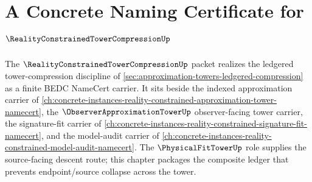 \chapter{A Concrete Naming Certificate for $\RealityConstrainedTowerCompressionUp$}
\label{ch:concrete-instances-reality-constrained-tower-compression-namecert}

The $\RealityConstrainedTowerCompressionUp$ packet realizes the ledgered tower-compression discipline of \autoref{sec:approximation-towers-ledgered-compression} as a finite BEDC NameCert carrier. It sits beside the indexed approximation carrier of \autoref{ch:concrete-instances-reality-constrained-approximation-tower-namecert}, the $\ObserverApproximationTowerUp$ observer-facing tower carrier, the signature-fit carrier of \autoref{ch:concrete-instances-reality-constrained-signature-fit-namecert}, and the model-audit carrier of \autoref{ch:concrete-instances-reality-constrained-model-audit-namecert}. The $\PhysicalFitTowerUp$ role supplies the source-facing descent route; this chapter packages the composite ledger that prevents endpoint/source collapse across the tower.

